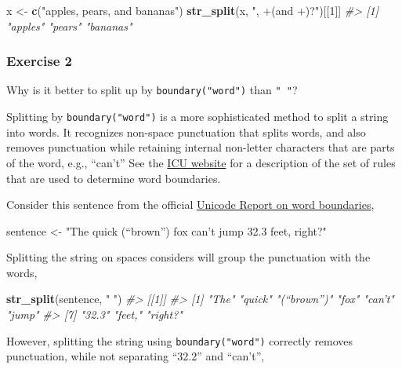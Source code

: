 \documentclass[]{book}
\newenvironment{Shaded}{\begin{snugshade}}{\end{snugshade}}
\newcommand{\CommentTok}[1]{\textcolor[rgb]{0.56,0.35,0.01}{\textit{#1}}}
\newcommand{\DecValTok}[1]{\textcolor[rgb]{0.00,0.00,0.81}{#1}}
\newcommand{\KeywordTok}[1]{\textcolor[rgb]{0.13,0.29,0.53}{\textbf{#1}}}
\newcommand{\NormalTok}[1]{#1}
\newcommand{\StringTok}[1]{\textcolor[rgb]{0.31,0.60,0.02}{#1}}
\theoremstyle{plain}
\theoremstyle{remark}
\theoremstyle{definition}
\theoremstyle{definition}
\theoremstyle{definition}
\theoremstyle{remark}
\begin{document}
\begin{Shaded}
\begin{Highlighting}[]
\NormalTok{x <-}\StringTok{ }\KeywordTok{c}\NormalTok{(}\StringTok{"apples, pears, and bananas"}\NormalTok{)}
\KeywordTok{str_split}\NormalTok{(x, }\StringTok{", +(and +)?"}\NormalTok{)[[}\DecValTok{1}\NormalTok{]]}
\CommentTok{#> [1] "apples"  "pears"   "bananas"}
\end{Highlighting}
\end{Shaded}

\hypertarget{exercise-2-38}{%
\subsubsection{Exercise 2}\label{exercise-2-38}}

Why is it better to split up by \texttt{boundary("word")} than
\texttt{"\ "}?

Splitting by \texttt{boundary("word")} is a more sophisticated method to
split a string into words. It recognizes non-space punctuation that
splits words, and also removes punctuation while retaining internal
non-letter characters that are parts of the word, e.g., ``can't'' See
the \href{http://userguide.icu-project.org/boundaryanalysis}{ICU
website} for a description of the set of rules that are used to
determine word boundaries.

Consider this sentence from the official
\href{http://www.unicode.org/reports/tr29/\#Word_Boundaries}{Unicode
Report on word boundaries},

\begin{Shaded}
\begin{Highlighting}[]
\NormalTok{sentence <-}\StringTok{ "The quick (“brown”) fox can’t jump 32.3 feet, right?"}
\end{Highlighting}
\end{Shaded}

Splitting the string on spaces considers will group the punctuation with
the words,

\begin{Shaded}
\begin{Highlighting}[]
\KeywordTok{str_split}\NormalTok{(sentence, }\StringTok{" "}\NormalTok{)}
\CommentTok{#> [[1]]}
\CommentTok{#> [1] "The"       "quick"     "(“brown”)" "fox"       "can’t"     "jump"     }
\CommentTok{#> [7] "32.3"      "feet,"     "right?"}
\end{Highlighting}
\end{Shaded}

However, splitting the string using \texttt{boundary("word")} correctly
removes punctuation, while not separating ``32.2'' and ``can't'',
\end{document}
